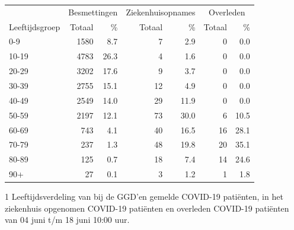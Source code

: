 \documentclass[
  english,
  man,floatsintext]{apa6}
\begin{document}
\begin{table}
\centering\begingroup\fontsize{11}{13}\selectfont

\begin{threeparttable}
\begin{tabular}{lrrrrrr}
\toprule
\multicolumn{1}{c}{ } & \multicolumn{2}{c}{Besmettingen} & \multicolumn{2}{c}{Ziekenhuisopnames} & \multicolumn{2}{c}{Overleden} \\
\cmidrule(l{3pt}r{3pt}){2-3} \cmidrule(l{3pt}r{3pt}){4-5} \cmidrule(l{3pt}r{3pt}){6-7}
Leeftijdsgroep & Totaal & \% & Totaal & \% & Totaal & \%\\
\midrule
0-9 & 1580 & 8.7 & 7 & 2.9 & 0 & 0.0\\
10-19 & 4783 & 26.3 & 4 & 1.6 & 0 & 0.0\\
20-29 & 3202 & 17.6 & 9 & 3.7 & 0 & 0.0\\
30-39 & 2755 & 15.1 & 12 & 4.9 & 0 & 0.0\\
40-49 & 2549 & 14.0 & 29 & 11.9 & 0 & 0.0\\
50-59 & 2197 & 12.1 & 73 & 30.0 & 6 & 10.5\\
60-69 & 743 & 4.1 & 40 & 16.5 & 16 & 28.1\\
70-79 & 237 & 1.3 & 48 & 19.8 & 20 & 35.1\\
80-89 & 125 & 0.7 & 18 & 7.4 & 14 & 24.6\\
90+ & 27 & 0.1 & 3 & 1.2 & 1 & 1.8\\
\bottomrule
\end{tabular}
\begin{tablenotes}
\item[1] Leeftijdsverdeling van bij de GGD’en gemelde COVID-19 patiënten, in het ziekenhuis opgenomen COVID-19 patiënten en overleden COVID-19 patiënten van 04 juni t/m 18 juni 10:00 uur.
\end{tablenotes}
\end{threeparttable}
\endgroup{}
\end{table}

\newpage
\end{document}
